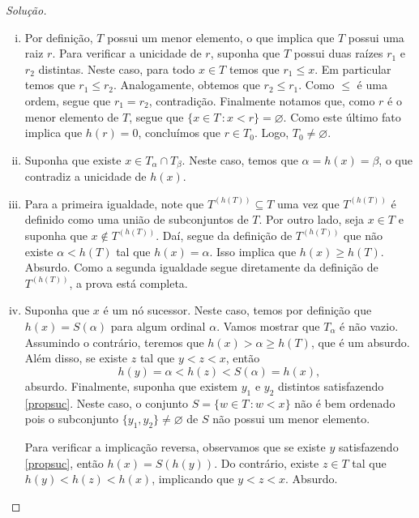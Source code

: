 \documentclass[a4paper]{article}
\begin{document}
\begin{proof}[Solução]\hfill
  \begin{enumerate}[(i)]

  \item Por definição, \(T\) possui um menor
    elemento, o que implica que \(T\) possui uma raiz \(r\). Para verificar a
    unicidade de \(r\), suponha que \(T\) possui duas raízes \(r_1\) e \(r_2\)
    distintas. Neste caso,  para todo \(x\in T\) temos que
    \(r_1\leq x\). Em particular temos que
    \(r_1\leq r_2\). Analogamente, obtemos que \(r_2\leq r_1\). Como \(\leq\) é
    uma ordem, segue que \(r_1=r_2\), contradição. Finalmente notamos que,
    como \(r\) é o menor elemento de \(T\), segue que \(\{x\in T\,\colon
    x<r\}=\varnothing\). Como este último fato implica que \(h(r)=0\), concluímos que
    \(r\in T_0\). Logo, \(T_0\not=\varnothing\).

  \item Suponha que existe \(x\in T_\alpha\cap T_\beta\). Neste caso, temos que
    \(\alpha=h(x)=\beta\), o que contradiz a unicidade de \(h(x)\).

  \item Para a primeira igualdade, note que \(T^{(h(T))}\subseteq T\) uma vez
    que \(T^{(h(T))}\) é definido como uma união de subconjuntos de \(T\). Por
    outro lado, seja \(x\in T\) e suponha que \(x\not\in T^{(h(T))}\). Daí,
    segue da definição de \(T^{(h(T))}\) que não existe \(\alpha < h(T)\) tal
    que \(h(x)=\alpha\). Isso implica
    que \(h(x)\geq h(T)\). Absurdo. Como a segunda igualdade segue diretamente da
    definição de \(T^{(h(T))}\), a prova está completa. 

  \item Suponha que \(x\) é um nó sucessor. Neste caso, temos por definição
    que \(h(x)=S(\alpha)\) para algum ordinal \(\alpha\). Vamos mostrar que
    \(T_\alpha\) é não vazio. Assumindo o contrário, teremos que
    \(h(x)>\alpha\geq h(T)\), que é um absurdo. Além disso,
    se  existe \(z\) tal que \(y<z<x\), então
    \[h(y)=\alpha<h(z)<S(\alpha)=h(x),\] absurdo. Finalmente, suponha que
    existem \(y_1\)
    e \(y_2\) distintos satisfazendo \eqref{propsuc}. Neste caso, o conjunto \(S=\{w\in
    T\,\colon w <x\}\) não é bem ordenado pois o subconjunto
    \(\{y_1,y_2\}\not = \varnothing\) de \(S\) não possui um menor elemento.

    Para verificar a implicação reversa, observamos que se existe \(y\) satisfazendo
    \eqref{propsuc}, então \(h(x)=S(h(y))\). Do contrário, existe \(z\in T\) tal
    que \(h(y)<h(z)<h(x)\), implicando que \(y<z<x\). Absurdo.


\end{enumerate}
\end{proof}
\end{document}
